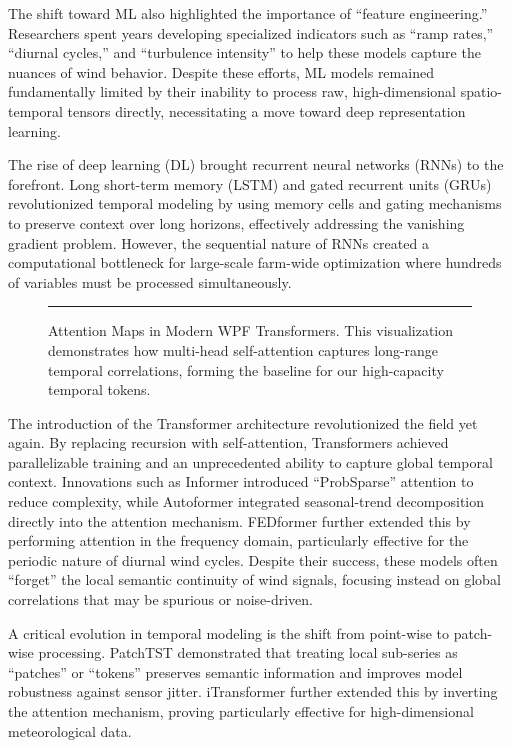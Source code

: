 The shift toward ML also highlighted the importance of ``feature engineering.'' Researchers spent years developing specialized indicators such as ``ramp rates,'' ``diurnal cycles,'' and ``turbulence intensity'' to help these models capture the nuances of wind behavior. Despite these efforts, ML models remained fundamentally limited by their inability to process raw, high-dimensional spatio-temporal tensors directly, necessitating a move toward deep representation learning.

The rise of deep learning (DL) brought recurrent neural networks (RNNs) to the forefront. Long short-term memory (LSTM) and gated recurrent units (GRUs) revolutionized temporal modeling by using memory cells and gating mechanisms to preserve context over long horizons, effectively addressing the vanishing gradient problem. However, the sequential nature of RNNs created a computational bottleneck for large-scale farm-wide optimization where hundreds of variables must be processed simultaneously. 

\begin{figure}[!t]
\centering
\rule{0.48\textwidth}{0.35\textwidth}
\caption{Attention Maps in Modern WPF Transformers. This visualization demonstrates how multi-head self-attention captures long-range temporal correlations, forming the baseline for our high-capacity temporal tokens.}
\label{fig:attention_vis}
\end{figure}

The introduction of the Transformer architecture \cite{vaswani2017attention} revolutionized the field yet again. By replacing recursion with self-attention, Transformers achieved parallelizable training and an unprecedented ability to capture global temporal context. Innovations such as Informer \cite{zhou2021informer} introduced ``ProbSparse'' attention to reduce complexity, while Autoformer \cite{wu2021autoformer} integrated seasonal-trend decomposition directly into the attention mechanism. FEDformer \cite{zhou2022fedformer} further extended this by performing attention in the frequency domain, particularly effective for the periodic nature of diurnal wind cycles. Despite their success, these models often ``forget'' the local semantic continuity of wind signals, focusing instead on global correlations that may be spurious or noise-driven.

A critical evolution in temporal modeling is the shift from point-wise to patch-wise processing. PatchTST \cite{nie2023patchtst} demonstrated that treating local sub-series as ``patches'' or ``tokens'' preserves semantic information and improves model robustness against sensor jitter. iTransformer \cite{liu2024itransformer} further extended this by inverting the attention mechanism, proving particularly effective for high-dimensional meteorological data. 

